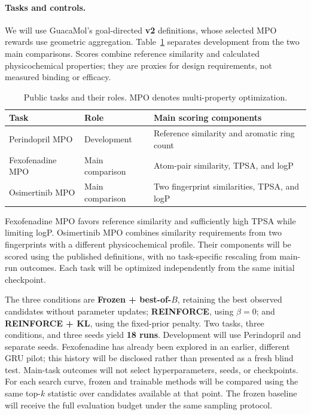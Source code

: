 \documentclass{article}
\begin{document}
\paragraph{Tasks and controls.}
We will use GuacaMol's goal-directed \textbf{v2} definitions, whose selected MPO
rewards use geometric aggregation. Table~\ref{tab:tasks} separates development
from the two main comparisons. Scores combine reference similarity and
calculated physicochemical properties; they are proxies for design requirements,
not measured binding or efficacy.

\begin{table}[H]
\caption{Public tasks and their roles. MPO denotes multi-property optimization.}
\label{tab:tasks}
\centering
\begin{tabularx}{\linewidth}{@{}l l X@{}}
\toprule
Task & Role & Main scoring components \\
\midrule
Perindopril MPO & Development & Reference similarity and aromatic ring count \\
Fexofenadine MPO & Main comparison & Atom-pair similarity, TPSA, and logP \\
Osimertinib MPO & Main comparison & Two fingerprint similarities, TPSA, and logP \\
\bottomrule
\end{tabularx}
\end{table}

Fexofenadine MPO favors reference similarity and sufficiently high TPSA while
limiting logP. Osimertinib MPO combines similarity requirements from two
fingerprints with a different physicochemical profile. Their components will be
scored using the published definitions, with no task-specific rescaling from
main-run outcomes. Each task will be optimized independently from the same
initial checkpoint.

The three conditions are \textbf{Frozen + best-of-$B$}, retaining the best
observed candidates without parameter updates; \textbf{REINFORCE}, using
$\beta=0$; and \textbf{REINFORCE + KL}, using the fixed-prior penalty. Two tasks,
three conditions, and three seeds yield \textbf{18 runs}. Development will use
Perindopril and separate seeds. Fexofenadine has already been explored in an
earlier, different GRU pilot; this history will be disclosed rather than
presented as a fresh blind test. Main-task outcomes will not select
hyperparameters, seeds, or checkpoints. For each search curve, frozen and
trainable methods will be compared using the same top-$k$ statistic over
candidates available at that point. The frozen baseline will receive the full
evaluation budget under the same sampling protocol.
\end{document}
